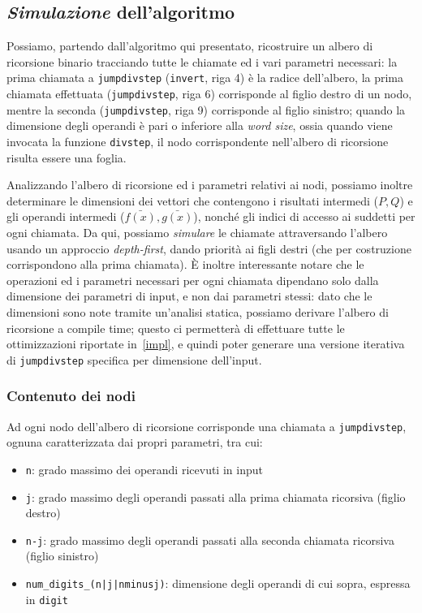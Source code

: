     \subsection*{\textbf{\textit{Simulazione} dell'algoritmo}} Possiamo, partendo dall'algoritmo qui presentato, ricostruire un albero di ricorsione binario tracciando tutte le
    chiamate ed i vari parametri necessari: la prima chiamata a \texttt{jumpdivstep} (\texttt{invert}, riga 4) è la radice dell'albero, 
    la prima chiamata effettuata (\texttt{jumpdivstep}, riga 6) corrisponde al figlio destro di un nodo, mentre la seconda (\texttt{jumpdivstep}, riga 9) corrisponde al
    figlio sinistro; quando la dimensione degli operandi è pari o inferiore alla \textit{word size}, ossia quando viene 
    invocata la funzione \texttt{divstep}, il nodo corrispondente nell'albero di ricorsione risulta essere una foglia.
    
    Analizzando l'albero di ricorsione ed i parametri relativi ai nodi, possiamo inoltre determinare le dimensioni
    dei vettori che contengono i risultati intermedi ($P, Q$) e gli operandi intermedi
    ($\bar{f(x)}, \bar{g(x)}$), nonché gli indici di accesso ai suddetti per ogni chiamata. Da qui, possiamo \textit{simulare}
    le chiamate attraversando l'albero usando un approccio \textit{depth-first}, dando priorità ai figli destri
    (che per costruzione corrispondono alla prima chiamata).
    È inoltre interessante notare che le operazioni ed i parametri necessari per ogni chiamata dipendano solo dalla 
    dimensione dei parametri di input, e non dai parametri stessi: dato che le dimensioni sono note tramite un'analisi statica, possiamo derivare
    l'albero di ricorsione a compile time; questo ci permetterà di effettuare tutte le ottimizzazioni
    riportate in~\ref{impl}, e quindi poter generare una versione
    iterativa di \texttt{jumpdivstep} specifica per dimensione dell'input.

    \subsubsection*{Contenuto dei nodi}
    Ad ogni nodo dell'albero di ricorsione corrisponde una chiamata a \texttt{jumpdivstep}, ognuna caratterizzata
    dai propri parametri, tra cui:
    \begin{itemize}
        \item \texttt{n}: grado massimo dei operandi ricevuti in input
        \item \texttt{j}: grado massimo degli operandi passati alla prima chiamata ricorsiva (figlio destro)
        \item \texttt{n-j}: grado massimo degli operandi passati alla seconda chiamata ricorsiva (figlio sinistro)
        \item \texttt{num\_digits\_(n|j|nminusj)}: dimensione degli operandi di cui sopra, espressa in \texttt{digit}
    \end{itemize}


